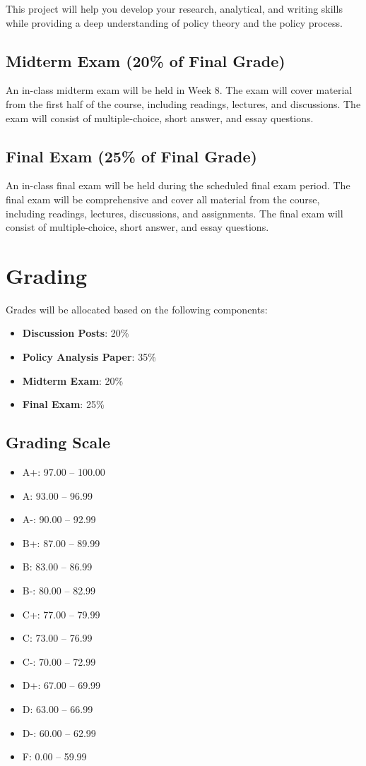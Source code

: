 \documentclass[12pt, letterpaper]{article}
\begin{document}
This project will help you develop your research, analytical, and writing skills while providing a deep understanding of policy theory and the policy process.

\subsection*{Midterm Exam (20\% of Final Grade)}
An in-class midterm exam will be held in Week 8. The exam will cover material from the first half of the course, including readings, lectures, and discussions. The exam will consist of multiple-choice, short answer, and essay questions.

\subsection*{Final Exam (25\% of Final Grade)}
An in-class final exam will be held during the scheduled final exam period. The final exam will be comprehensive and cover all material from the course, including readings, lectures, discussions, and assignments. The final exam will consist of multiple-choice, short answer, and essay questions.

\section{Grading}
Grades will be allocated based on the following components:
\begin{itemize}
    \item \textbf{Discussion Posts}: 20\%
    \item \textbf{Policy Analysis Paper}: 35\%
    \item \textbf{Midterm Exam}: 20\%
    \item \textbf{Final Exam}: 25\%    
\end{itemize}

\subsection*{Grading Scale}

\begin{itemize}
    \item A+: 97.00 -- 100.00
    \item A: 93.00 -- 96.99
    \item A-: 90.00 -- 92.99
    \item B+: 87.00 -- 89.99
    \item B: 83.00 -- 86.99
    \item B-: 80.00 -- 82.99
    \item C+: 77.00 -- 79.99
    \item C: 73.00 -- 76.99
    \item C-: 70.00 -- 72.99
    \item D+: 67.00 -- 69.99
    \item D: 63.00 -- 66.99
    \item D-: 60.00 -- 62.99
    \item F: 0.00 -- 59.99
\end{itemize}
\end{document}
